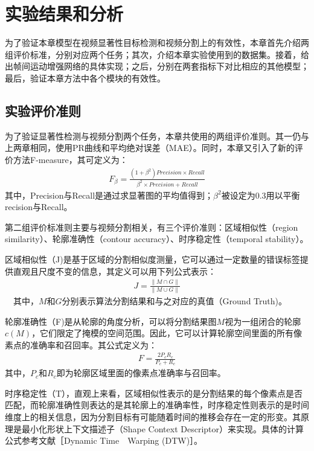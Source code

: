 \section{实验结果和分析}

为了验证本章模型在视频显著性目标检测和视频分割上的有效性，本章首先介绍两组评价标准，分别对应两个任务；其次，介绍本章实验使用到的数据集。接着，给出帧间运动增强网络的具体实现；之后，分别在两套指标下对比相应的其他模型；最后，验证本章方法中各个模块的有效性。
\subsection{实验评价准则}
为了验证显著性检测与视频分割两个任务，本章共使用的两组评价准则。其一仍与上两章相同，使用PR曲线和平均绝对误差（MAE）。同时，本章又引入了新的评价方法F-measure，其可定义为：
\begin{equation}
\label{f_measure}
\begin{aligned}
   F_\beta = \frac{(1+\beta^2)Precision \times Recall }{\beta^2\times Precision + Recall}
 \end{aligned}
\end{equation} 其中，Precision与Recall是通过求显著图的平均值得到；$\beta^2$被设定为0.3用以平衡recision与Recall。

第二组评价标准则主要与视频分割相关，有三个评价准则：区域相似性（region similarity）、轮廓准确性（contour accuracy）、时序稳定性（temporal stability）。

区域相似性（J)是基于区域的分割相似度测量，它可以通过一定数量的错误标签提供直观且尺度不变的信息，其定义可以用下列公式表示：
\begin{equation}
\label{region_similarity}
\begin{aligned}
   J = \frac{\|M \cap G\|}{\|M \cup G\|}
 \end{aligned}
\end{equation}　其中，$M$和$G$分别表示算法分割结果和与之对应的真值（Ground Truth)。

轮廓准确性（F)是从轮廓的角度分析，可以将分割结果图$M$视为一组闭合的轮廓$c(M)$，它们限定了掩模的空间范围。因此，它可以计算轮廓空间里面的所有像素点的准确率和召回率。其公式定义为：
\begin{equation}
\label{region_similarity}
\begin{aligned}
   F = \frac{2P_cR_c}{P_c + R_c}
 \end{aligned}
\end{equation} 其中，$P_c$和$R_c$即为轮廓区域里面的像素点准确率与召回率。

时序稳定性（T），直观上来看，区域相似性表示的是分割结果的每个像素点是否匹配，而轮廓准确性则表达的是其轮廓上的准确率性，时序稳定性则表示的是时间维度上的相关信息，因为分割目标有可能随着时间的推移会存在一定的形变。其原理是最小化形状上下文描述子（Shape Context Descriptor）来实现。具体的计算公式参考文献［Dynamic Time　Warping (DTW)］。
